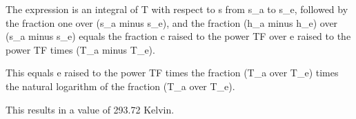 The expression is an integral of T with respect to s from s_a to s_e, followed by the fraction one over (s_a minus s_e), and the fraction (h_a minus h_e) over (s_a minus s_e) equals the fraction c raised to the power TF over e raised to the power TF times (T_a minus T_e).

This equals e raised to the power TF times the fraction (T_a over T_e) times the natural logarithm of the fraction (T_a over T_e).

This results in a value of 293.72 Kelvin.